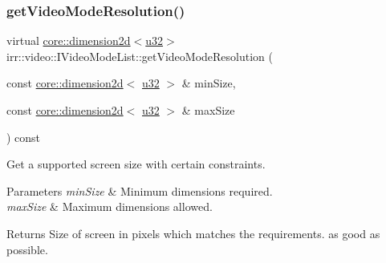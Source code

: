 \subsubsection{\texorpdfstring{get\+Video\+Mode\+Resolution()}{getVideoModeResolution()}\hspace{0.1cm}{\footnotesize\ttfamily [3/4]}}
{\footnotesize\ttfamily virtual \hyperlink{classirr_1_1core_1_1dimension2d}{core\+::dimension2d}$<$\hyperlink{namespaceirr_a0416a53257075833e7002efd0a18e804}{u32}$>$ irr\+::video\+::\+I\+Video\+Mode\+List\+::get\+Video\+Mode\+Resolution (\begin{DoxyParamCaption}\item[{const \hyperlink{classirr_1_1core_1_1dimension2d}{core\+::dimension2d}$<$ \hyperlink{namespaceirr_a0416a53257075833e7002efd0a18e804}{u32} $>$ \&}]{min\+Size,  }\item[{const \hyperlink{classirr_1_1core_1_1dimension2d}{core\+::dimension2d}$<$ \hyperlink{namespaceirr_a0416a53257075833e7002efd0a18e804}{u32} $>$ \&}]{max\+Size }\end{DoxyParamCaption}) const\hspace{0.3cm}{\ttfamily [pure virtual]}}



Get a supported screen size with certain constraints. 


\begin{DoxyParams}{Parameters}
{\em min\+Size} & Minimum dimensions required. \\
\hline
{\em max\+Size} & Maximum dimensions allowed. \\
\hline
\end{DoxyParams}
\begin{DoxyReturn}{Returns}
Size of screen in pixels which matches the requirements. as good as possible. 
\end{DoxyReturn}
\mbox{\label{classirr_1_1video_1_1IVideoModeList_aa06b5905ac9c04fb38a17bf798fccc9b}} 
